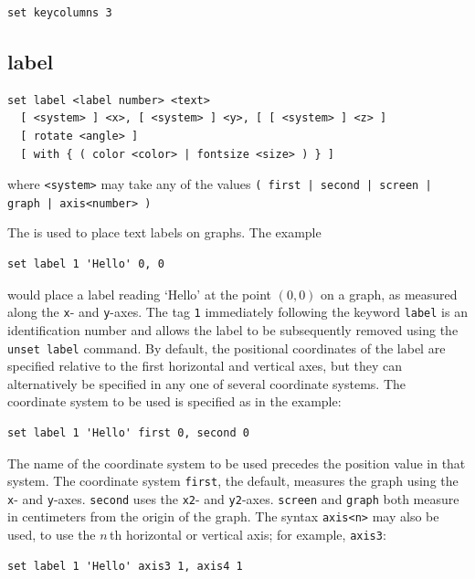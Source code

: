 \begin{verbatim}
set keycolumns 3
\end{verbatim}


\subsection{label}

\begin{verbatim}
set label <label number> <text>
  [ <system> ] <x>, [ <system> ] <y>, [ [ <system> ] <z> ]
  [ rotate <angle> ]
  [ with { ( color <color> | fontsize <size> ) } ]
\end{verbatim}

\noindent where {\tt <system>} may take any of the values
\newline\noindent
{\tt ( first | second | screen | graph | axis<number> )}
\vspace{5mm}

The  is used to place text labels on graphs. The example

\begin{verbatim}
set label 1 'Hello' 0, 0
\end{verbatim}

\noindent would place a label reading `Hello' at the point $(0,0)$ on a graph,
as measured along the {\tt x}- and {\tt y}-axes.  The tag {\tt 1} immediately
following the keyword {\tt label} is an identification number and allows the
label to be subsequently removed using the {\tt unset label} command. By
default, the positional coordinates of the label are specified relative to the
first horizontal and vertical axes, but they can alternatively be specified in
any one of several coordinate systems. The coordinate system to be used is
specified as in the example:

\begin{verbatim}
set label 1 'Hello' first 0, second 0
\end{verbatim}

\noindent The name of the coordinate system to be used precedes the position
value in that system. The coordinate system {\tt first}, the default, measures
the graph using the {\tt x}- and {\tt y}-axes. {\tt second} uses the {\tt x2}-
and {\tt y2}-axes.  {\tt screen} and {\tt graph} both measure in centimeters
from the origin of the graph.  The syntax {\tt axis<n>} may also be used, to
use the $n\,$th horizontal or vertical axis; for example, {\tt axis3}:

\begin{verbatim}
set label 1 'Hello' axis3 1, axis4 1
\end{verbatim}

